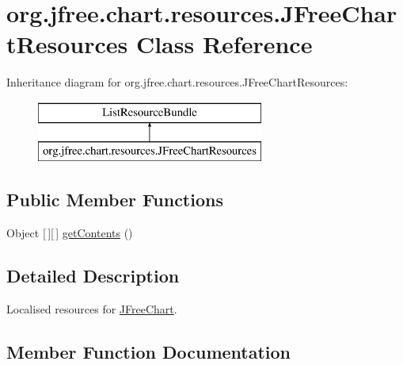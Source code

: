 \hypertarget{classorg_1_1jfree_1_1chart_1_1resources_1_1_j_free_chart_resources}{}\section{org.\+jfree.\+chart.\+resources.\+J\+Free\+Chart\+Resources Class Reference}
\label{classorg_1_1jfree_1_1chart_1_1resources_1_1_j_free_chart_resources}
Inheritance diagram for org.\+jfree.\+chart.\+resources.\+J\+Free\+Chart\+Resources\+:\begin{figure}[H]
\begin{center}
\leavevmode
\includegraphics[height=2.000000cm]{classorg_1_1jfree_1_1chart_1_1resources_1_1_j_free_chart_resources}
\end{center}
\end{figure}
\subsection*{Public Member Functions}
\begin{DoxyCompactItemize}
\item 
Object \mbox{[}$\,$\mbox{]}\mbox{[}$\,$\mbox{]} \mbox{\hyperlink{classorg_1_1jfree_1_1chart_1_1resources_1_1_j_free_chart_resources_a3686045513dd5468e34d758a2423678d}{get\+Contents}} ()
\end{DoxyCompactItemize}


\subsection{Detailed Description}
Localised resources for \mbox{\hyperlink{classorg_1_1jfree_1_1chart_1_1_j_free_chart}{J\+Free\+Chart}}. 

\subsection{Member Function Documentation}
\mbox{\label{classorg_1_1jfree_1_1chart_1_1resources_1_1_j_free_chart_resources_a3686045513dd5468e34d758a2423678d}} 
